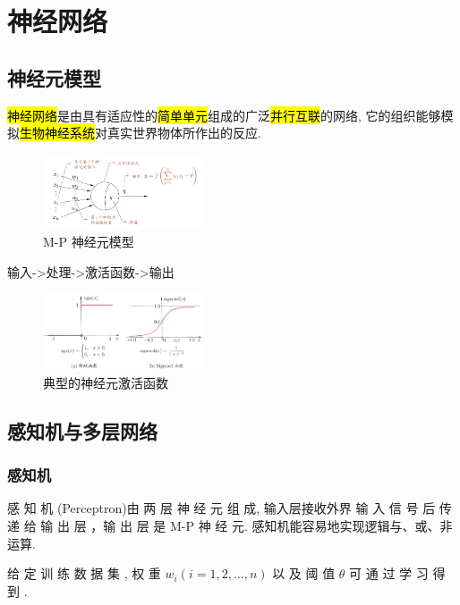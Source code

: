 \newpage
\section{神经网络}
\subsection{神经元模型}

\begin{definition}
    \hl{神经网络}是由具有适应性的\hl{简单单元}组成的广泛\hl{并行互联}的网络, 它的组织能够模拟\hl{生物神经系统}对真实世界物体所作出的反应. 
\end{definition}


\begin{figure}[!htb]
    \centering
    \includegraphics[width=0.42\textwidth]{pic/ML5/M-P 神经元模型}
    \caption{M-P 神经元模型}
\end{figure}
输入->处理->激活函数->输出


\begin{figure}[!htb]
    \centering
    \includegraphics[width=0.42\textwidth]{pic/ML5/典型的神经元激活函数}
    \caption{典型的神经元激活函数}
\end{figure}

\subsection{感知机与多层网络}
\subsubsection{感知机}
感 知 机 (Perceptron)由 两 层 神 经 元 组 成, 输入层接收外界 输 入 信 号 后 传 递 给 输 出 层 ，输 出 层 是 M-P 神 经 元. 感知机能容易地实现逻辑与、或、非运算. 

给 定 训 练 数 据 集 , 权 重 $w_i(i=1,2,\dots,n)$ 以 及 阈 值 $\theta$ 可 通 过 学 习 得 到 . 

